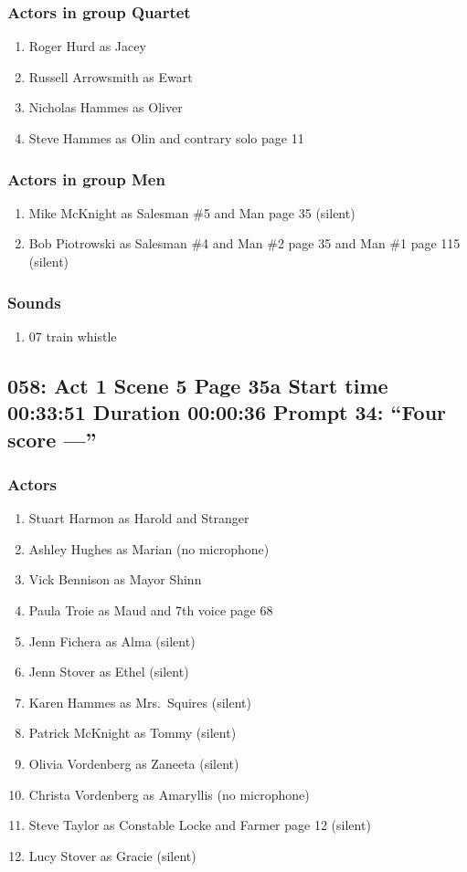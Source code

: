 \subsubsection{Actors in group Quartet}
\begin{enumerate}
\item Roger Hurd as Jacey
\item Russell Arrowsmith as Ewart
\item Nicholas Hammes as Oliver
\item Steve Hammes as Olin and contrary solo page 11
\end{enumerate}
\subsubsection{Actors in group Men}
\begin{enumerate}
\item Mike McKnight as Salesman \#5 and Man page 35 (silent)
\item Bob Piotrowski as Salesman \#4 and Man \#2 page 35 and Man \#1 page 115 (silent)
\end{enumerate}

\subsubsection{Sounds}
\begin{enumerate}
\item 07 train whistle
\end{enumerate}
\subsection{058: Act 1 Scene 5 Page 35a Start time 00:33:51 Duration 00:00:36 Prompt 34: ``Four score ---''}

\subsubsection{Actors}
\begin{enumerate}
\item Stuart Harmon as Harold and Stranger
\item Ashley Hughes as Marian (no microphone)
\item Vick Bennison as Mayor Shinn
\item Paula Troie as Maud and 7th voice page 68
\item Jenn Fichera as Alma (silent)
\item Jenn Stover as Ethel (silent)
\item Karen Hammes as Mrs.~Squires (silent)
\item Patrick McKnight as Tommy (silent)
\item Olivia Vordenberg as Zaneeta (silent)
\item Christa Vordenberg as Amaryllis (no microphone)
\item Steve Taylor as Constable Locke and Farmer page 12 (silent)
\item Lucy Stover as Gracie (silent)
\end{enumerate}
